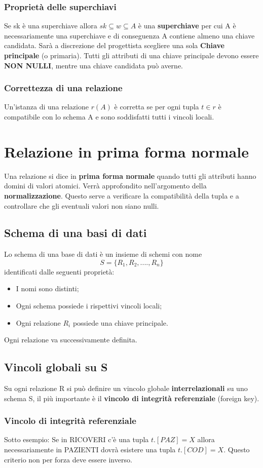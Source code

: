 \documentclass[10pt,twocolumn]{article}
\begin{document}
\subsubsection{Proprietà delle superchiavi}
Se sk è una superchiave allora $sk \subseteq w \subseteq A$ è una \textbf{superchiave} per cui A è necessariamente una superchiave e di conseguenza A contiene almeno una chiave candidata.
Sarà a discrezione del progettista scegliere una sola \textbf{Chiave principale} (o primaria). Tutti gli attributi di una chiave principale devono essere \textbf{NON NULLI}, mentre una chiave candidata può averne.
\subsubsection{Correttezza di una relazione}
Un'istanza di una relazione $r(A)$ è corretta se per ogni tupla $t \in r$ è compatibile con lo schema A e sono soddisfatti tutti i vincoli locali.
\section{Relazione in prima forma normale}
Una relazione si dice in \textbf{prima forma normale} quando tutti gli attributi hanno domini di valori atomici. Verrà approfondito nell'argomento della \textbf{normalizzazione}. Questo serve a verificare la compatibilità della tupla e a controllare che gli eventuali valori non siano nulli.
\subsection{Schema di una basi di dati}
Lo schema di una base di dati è un insieme di schemi con nome \[ S = \{ R_1, R_2,....,R_n\}\]
identificati dalle seguenti proprietà:\begin{itemize}
    \item I nomi sono distinti;
    \item Ogni schema possiede i rispettivi vincoli locali;
    \item Ogni relazione $R_i$ possiede una chiave principale.
\end{itemize}
Ogni relazione va successivamente definita.
\subsection{Vincoli globali su S}
Su ogni relazione R si può definire un vincolo globale \textbf{interrelazionali} su uno schema S, il più importante è il \textbf{vincolo di integrità referenziale} (foreign key).
\subsubsection{Vincolo di integrità referenziale}
Sotto esempio: Se in RICOVERI c'è una tupla $t.[PAZ]=X$ allora necessariamente in PAZIENTI dovrà esistere una tupla $t.[COD]=X$. Questo criterio non per forza deve essere inverso. 
\end{document}
